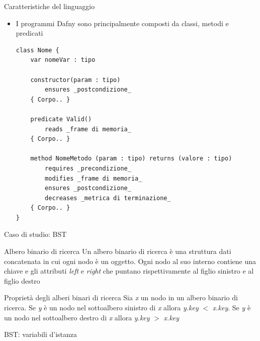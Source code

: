 \documentclass{beamer}
\begin{document}
\begin{frame}[containsverbatim]{Caratteristiche del linguaggio}
        \begin{itemize}
            \item I programmi Dafny sono principalmente composti da classi, metodi e predicati
            \begin{lstlisting}[basicstyle=\tiny]
class Nome {
    var nomeVar : tipo
    
    constructor(param : tipo)
        ensures _postcondizione_
    { Corpo.. }

    predicate Valid()
        reads _frame di memoria_
    { Corpo.. }

    method NomeMetodo (param : tipo) returns (valore : tipo)
        requires _precondizione_
        modifies _frame di memoria_
        ensures _postcondizione_
        decreases _metrica di terminazione_
    { Corpo.. }
}
            \end{lstlisting}
        \end{itemize}
\end{frame}

\begin{frame}{Caso di studio: BST}
    \begin{block}{Albero binario di ricerca}
        Un albero binario di ricerca è una struttura dati concatenata in cui ogni nodo è un oggetto.
        Ogni nodo al suo interno contiene una chiave e gli attributi \textit{left} e \textit{right} che puntano
        rispettivamente al figlio sinistro e al figlio destro
    \end{block}
    \begin{block}{Proprietà degli alberi binari di ricerca}
        Sia \textit{x} un nodo in un albero binario di ricerca. Se \textit{y} è un nodo nel sottoalbero sinistro
        di \textit{x} allora \textit{y.key} $< $ \textit{x.key}. Se \textit{y} è un nodo nel sottoalbero destro
        di \textit{x} allora \textit{y.key} $> $ \textit{x.key}
    \end{block}
\end{frame}

\begin{frame}{BST: variabili d'istanza}
    
\end{frame}
\end{document}
